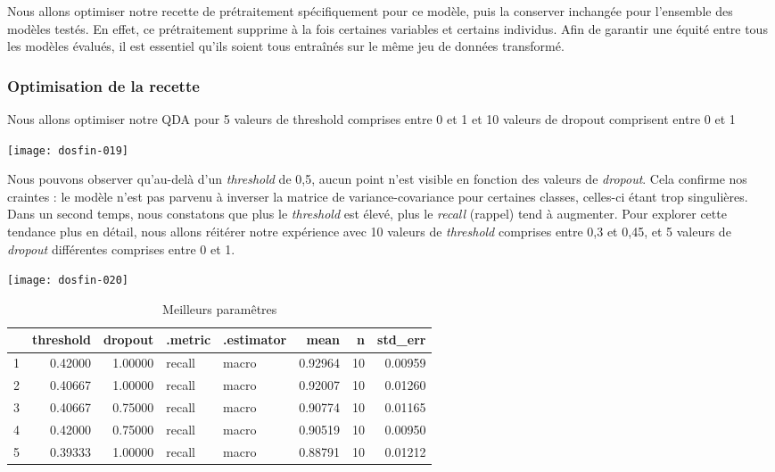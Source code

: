 \documentclass[a4paper,11pt]{article}
\begin{document}
Nous allons optimiser notre recette de prétraitement spécifiquement pour ce modèle, puis la conserver inchangée pour l’ensemble des modèles testés. En effet, ce prétraitement supprime à la fois certaines variables et certains individus. Afin de garantir une équité entre tous les modèles évalués, il est essentiel qu’ils soient tous entraînés sur le même jeu de données transformé.

\subsubsection{Optimisation de la recette}

Nous allons optimiser notre QDA pour 5 valeurs de threshold comprises entre 0 et 1 et 10 valeurs de dropout comprisent entre 0 et 1



\begin{center}

\texttt{[image: dosfin-019]}

Nous pouvons observer qu'au-delà d’un \textit{threshold} de 0{,}5, aucun point n’est visible en fonction des valeurs de \textit{dropout}. Cela confirme nos craintes : le modèle n’est pas parvenu à inverser la matrice de variance-covariance pour certaines classes, celles-ci étant trop singulières.
\newpage
Dans un second temps, nous constatons que plus le \textit{threshold} est élevé, plus le \textit{recall} (rappel) tend à augmenter. Pour explorer cette tendance plus en détail, nous allons réitérer notre expérience avec 10 valeurs de \textit{threshold} comprises entre 0{,}3 et 0{,}45, et 5 valeurs de \textit{dropout} différentes comprises entre 0 et 1.

\end{center}

\begin{center}

\texttt{[image: dosfin-020]}

\begin{table}[ht]
\centering
\begin{tabular}{rrrllrrr}
  \hline
 & threshold & dropout & .metric & .estimator & mean & n & std\_err \\ 
  \hline
1 & 0.42000 & 1.00000 & recall & macro & 0.92964 &     10 & 0.00959 \\ 
  2 & 0.40667 & 1.00000 & recall & macro & 0.92007 &     10 & 0.01260 \\ 
  3 & 0.40667 & 0.75000 & recall & macro & 0.90774 &     10 & 0.01165 \\ 
  4 & 0.42000 & 0.75000 & recall & macro & 0.90519 &     10 & 0.00950 \\ 
  5 & 0.39333 & 1.00000 & recall & macro & 0.88791 &     10 & 0.01212 \\ 
   \hline
\end{tabular}
\caption{Meilleurs paramêtres} 
\end{table}
\end{center}
\end{document}
